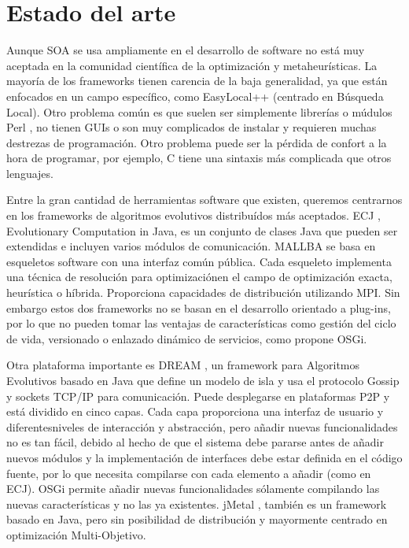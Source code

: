 \documentclass[runningheads]{llncs}
\begin{document}
\section{Estado del arte}
\label{sec:soa}

Aunque SOA se usa ampliamente en el desarrollo de software no está muy aceptada en la comunidad científica de la optimización y metaheurísticas. La mayoría de los frameworks tienen carencia de la baja generalidad, ya que están enfocados en un campo específico, como EasyLocal++ \cite{EASYLOCAL}(centrado en Búsqueda Local). Otro problema común es que suelen ser simplemente librerías o múdulos Perl \cite{PERL}, no tienen GUIs o son muy complicados de instalar y requieren muchas destrezas de programación. Otro problema puede ser la pérdida de confort a la hora de programar, por ejemplo, C tiene una sintaxis más complicada que otros lenguajes.

Entre la gran cantidad de herramientas software que existen, queremos centrarnos en los frameworks de algoritmos evolutivos distribuídos más aceptados. ECJ \cite{ECJ}, Evolutionary Computation in Java, es un conjunto de clases Java que pueden ser extendidas e incluyen varios módulos de comunicación. MALLBA \cite{MALLBA} se basa en esqueletos software con una interfaz común pública. Cada esqueleto implementa una técnica de resolución para optimizaciónen el campo de optimización exacta, heurística o híbrida. Proporciona capacidades de distribución utilizando MPI. Sin embargo estos dos frameworks no se basan en el desarrollo orientado a plug-ins, por lo que no pueden tomar las ventajas de características como gestión del ciclo de vida, versionado o enlazado dinámico de servicios, como propone OSGi.

Otra plataforma importante es DREAM \cite{DREAM}, un framework para
Algoritmos Evolutivos basado en Java que define un modelo de isla y
usa el protocolo Gossip y sockets TCP/IP para comunicación. Puede
desplegarse en plataformas P2P y está dividido en cinco capas. Cada
capa proporciona una interfaz de usuario y diferentesniveles de
interacción y abstracción, pero añadir nuevas funcionalidades no es
tan fácil, debido al hecho de que el sistema debe pararse antes de
añadir nuevos módulos y la implementación de interfaces debe estar
definida en el código fuente, por lo que necesita compilarse con cada
elemento a añadir (como en ECJ). OSGi permite añadir nuevas
funcionalidades sólamente compilando las nuevas características y no
las ya existentes. jMetal \cite{JMETAL},  también es un framework
basado en Java, pero sin posibilidad de distribución y mayormente
centrado en optimización Multi-Objetivo. %
\end{document}
